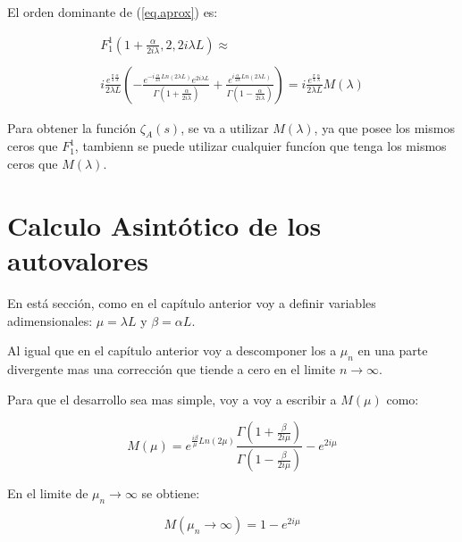 El orden dominante de (\ref{eq.aprox}) es:

\begin{equation}
\begin{array}{c}
    F _1 ^1 (1+  \frac{  \alpha}{2 i \lambda} ,2 ,2 i \lambda L  ) \approx \\ \\
   i  \frac{e ^{ \frac{\pi}{4} \frac{\alpha}{\lambda} } }{2 \lambda L}
    \left( -
    \frac{e ^{- i \frac{\alpha}{2 \lambda} Ln(2 \lambda L) } e ^{2 i \lambda L} }{\Gamma(1+\frac{ \alpha}{2 i \lambda})} +
    \frac{e ^{  i \frac{\alpha}{2 \lambda} Ln(2 \lambda L) }}               {\Gamma(1-\frac{ \alpha}{2 i \lambda})}
    \right) = 
    i  \frac{e ^{ \frac{\pi}{4} \frac{\alpha}{\lambda} } }{2 \lambda L}     M (\lambda) 
\end{array}
\label{eq.completa}
\end{equation}

Para obtener la función $\zeta _A (s) $, se va a utilizar $M( \lambda)$, ya que posee los mismos ceros que $F _1 ^1$, tambienn se puede utilizar cualquier funcíon que tenga los mismos ceros que $M ( \lambda )$.





\section{Calculo Asintótico de los autovalores}


En está sección, como en el capítulo anterior voy a definir variables adimensionales: $\mu = \lambda L $ y $\beta = \alpha L$.

Al igual que en el capítulo anterior voy a descomponer los a $\mu _n$ en una parte divergente mas una corrección que tiende a cero en el limite $n \rightarrow \infty$.

Para que el desarrollo sea mas simple, voy a voy a escribir a $M (\mu)$ como:

\begin{equation}
M (\mu) = e ^{\frac{i \beta }{\mu} Ln(2 \mu) }
\frac{\Gamma (1 + \frac{ \beta}{2 i \mu})}{\Gamma (1 - \frac{ \beta}{2 i \mu})}
- e ^{2 i \mu}
\label{eq.otro.mu}
\end{equation}


En el limite de $\mu _n \rightarrow \infty$ se obtiene:

\begin{equation}
    M(\mu _n \rightarrow \infty) = 
	1 - e ^{2 i \mu}
\end{equation}

